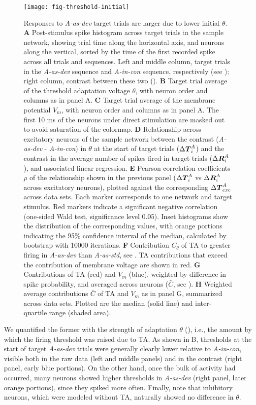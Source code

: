 \documentclass[9pt,lineno,onehalfspacing]{elife}
\newcommand{\dev}{\textit{A-as-dev}}
\newcommand{\msc}{\textit{A-in-con}}
\newcommand{\std}{\textit{A-as-std}}
\newcommand{\ifstringequal}[4]{%
  \ifnum\pdfstrcmp{#1}{#2}=0
  #3%
  \else
  #4%
  \fi
}
\newcommand{\seqreplace}[1]{\ifstringequal{dev}{#1}{\dev}{%
    \ifstringequal{std}{#1}{\std}{%
        \ifstringequal{msc}{#1}{\msc}{#1}%
    }%
}}
\newcommand{\R}[3][]{{}^{\seqreplace{#1}}_{}\boldsymbol R^{#2}_{#3}}
\newcommand{\T}[3][]{{}^{\seqreplace{#1}}_{}\boldsymbol T^{#2}_{#3}}
\begin{document}
\begin{figure}
    \texttt{[image: fig-threshold-initial]}
    \caption{%
        Responses to \dev{} target trials are larger due to lower initial $\theta$.
        \textbf{A} Post-stimulus spike histogram across target trials in the sample network, showing trial time along the horizontal axis, and neurons along the vertical, sorted by the time of the first recorded spike across all trials and sequences. Left and middle column, target trials in the \dev{} sequence and \msc{} sequence, respectively (see ); right column, contrast between these two ().
        \textbf{B} Target trial average of the threshold adaptation voltage $\theta$, with neuron order and columns as in panel A.
        \textbf{C} Target trial average of the membrane potential $V_m$, with neuron order and columns as in panel A. The first 10 ms of the neurons under direct stimulation are masked out to avoid saturation of the colormap.
        \textbf{D} Relationship across excitatory neurons of the sample network between the contrast (\dev{} - \msc{}) in $\theta$ at the start of target trials ($\Delta \T{A}{i}$) and the contrast in the average number of spikes fired in target trials ($\Delta \R{A}{i}$), and associated linear regression.
        \textbf{E} Pearson correlation coefficients $\rho$ of the relationship shown in the previous panel ($\Delta \T{A}{i}$ vs $\Delta \R{A}{i}$ across excitatory neurons), plotted against the corresponding $\Delta \T{A}{exc}$ across data sets. Each marker corresponds to one network and target stimulus. Red markers indicate a significant negative correlation (one-sided Wald test, significance level 0.05). Inset histograms show the distribution of the corresponding values, with orange portions indicating the 95\% confidence interval of the median, calculated by bootstrap with 10000 iterations.
        \textbf{F} Contribution $C_\theta$ of TA to greater firing in \dev{} than \std{}, see . TA contributions that exceed the contribution of membrane voltage are shown in red.
        \textbf{G} Contributions of TA (red) and $V_m$ (blue), weighted by difference in spike probability, and averaged across neurons ($\bar C$, see ).
        \textbf{H} Weighted average contributions $\bar C$ of TA and $V_m$ as in panel G, summarized across data sets. Plotted are the median (solid line) and inter-quartile range (shaded area).
    }
    \label{fig:threshold-initial}
\end{figure}

We quantified the former with the strength of adaptation $\theta$ (), i.e., the amount by which the firing threshold was raised due to TA. As shown in B, thresholds at the start of target \dev{} trials were generally clearly lower relative to \msc{}, visible both in the raw data (left and middle panels) and in the contrast (right panel, early blue portions). On the other hand, once the bulk of activity had occurred, many neurons showed higher thresholds in \dev{} (right panel, later orange portions), since they spiked more often. Finally, note that inhibitory neurons, which were modeled without TA, naturally showed no difference in $\theta$.
\end{document}
